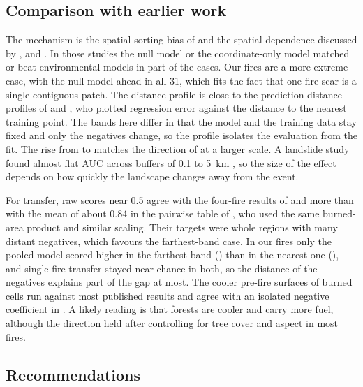 \documentclass[preprint,12pt,authoryear]{elsarticle}
\begin{document}
\subsection{Comparison with earlier work}
\label{sec:disc-lit}

The mechanism is the spatial sorting bias of \citet{Hijmans2012} and the spatial dependence discussed by \citet{Roberts2017}, \citet{Meyer2018} and \citet{Ploton2020}. In those studies the null model or the coordinate-only model matched or beat environmental models in part of the cases. Our fires are a more extreme case, with the null model ahead in all 31, which fits the fact that one fire scar is a single contiguous patch. The distance profile is close to the prediction-distance profiles of \citet{Brenning2023} and \citet{Frank2025}, who plotted regression error against the distance to the nearest training point. The bands here differ in that the model and the training data stay fixed and only the negatives change, so the profile isolates the evaluation from the fit. The rise from \vbandARf{} to \vbandFRf{} matches the direction of \citet{Zerouali2026} at a larger scale. A landslide study found almost flat AUC across buffers of 0.1 to 5~km \citep{Xiao2026}, so the size of the effect depends on how quickly the landscape changes away from the event.

For transfer, raw scores near 0.5 agree with the four-fire results of \citet{Stark2026} and \citet{Bekar2020} more than with the mean of about 0.84 in the pairwise table of \citet{Dimarco2026}, who used the same burned-area product and similar scaling. Their targets were whole regions with many distant negatives, which favours the farthest-band case. In our fires only the pooled model scored higher in the farthest band (\vtrPoolZFar) than in the nearest one (\vtrPoolZNear), and single-fire transfer stayed near chance in both, so the distance of the negatives explains part of the gap at most. The cooler pre-fire surfaces of burned cells run against most published results \citep{Maffei2018,ParkSim2023} and agree with an isolated negative coefficient in \citet{Das2023}. A likely reading is that forests are cooler and carry more fuel, although the direction held after controlling for tree cover and aspect in most fires.

\subsection{Recommendations}
\label{sec:disc-protocol}
\end{document}
